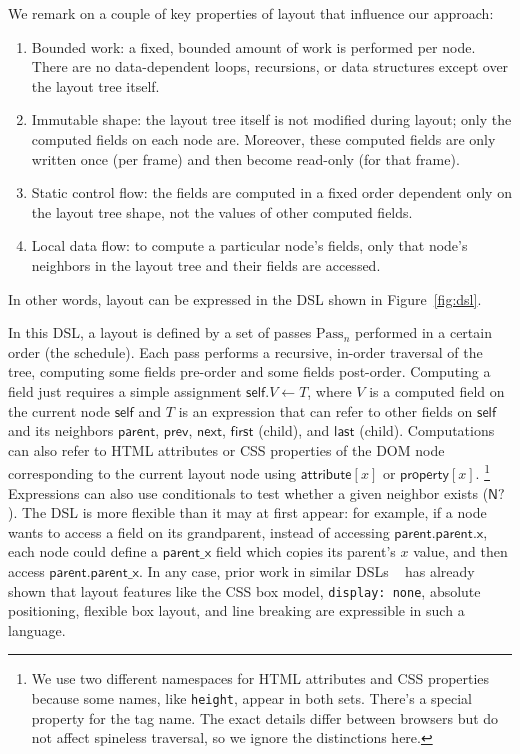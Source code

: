 We remark on a couple of key properties of layout
  that influence our approach:
\begin{enumerate}
    \item{Bounded work}: a fixed, bounded amount of work is performed per node. There are no data-dependent loops, recursions, or data structures except over the layout tree itself.
    \item{Immutable shape}: the layout tree itself is not modified during layout; only the computed fields on each node are. Moreover, these computed fields are only written once (per frame) and then become read-only (for that frame).
    \item{Static control flow}: the fields are computed in a fixed order dependent only on the layout tree shape, not the values of other computed fields.
    \item{Local data flow}: to compute a particular node's fields, only that node's neighbors in the layout tree and their fields are accessed.
\end{enumerate}
In other words, layout can be expressed in the DSL
  shown in Figure~\ref{fig:dsl}.

In this DSL, a layout is defined by a set of passes
  $\text{Pass}_n$ performed in a certain order (the schedule).
Each pass performs a recursive, in-order traversal of the tree,
  computing some fields pre-order and some fields post-order.
Computing a field just requires
  a simple assignment $\mathsf{self}.V \gets T$,
  where $V$ is a computed field on the current node $\mathsf{self}$
  and $T$ is an expression that can refer to
  other fields on $\mathsf{self}$ and its neighbors
  $\mathsf{parent}$, $\mathsf{prev}$, $\mathsf{next}$,
  $\mathsf{first}$ (child), and $\mathsf{last}$ (child).
Computations can also refer to HTML attributes or CSS properties
  of the DOM node corresponding to the current layout node
  using $\mathsf{attribute}[x]$ or $\mathsf{property}[x]$.%
\footnote{
    We use two different namespaces
    for HTML attributes and CSS properties
    because some names, like \texttt{height},
    appear in both sets.
    There's a special property for the tag name.
    The exact details differ between browsers
    but do not affect spineless traversal,
    so we ignore the distinctions here.
}
Expressions can also use conditionals
  to test whether a given neighbor exists ($\mathsf{N?}$).
The DSL is more flexible than it may at first appear:
  for example, if a node wants to access a field on its grandparent,
  instead of accessing $\mathsf{parent}.\mathsf{parent}.\mathsf{x}$,
  each node could define a $\mathsf{parent\_x}$ field which copies
  its parent's $x$ value,
  and then access $\mathsf{parent}.\mathsf{parent\_x}$.
In any case, prior work in similar DSLs%
  ~\cite{meyerovich-1, meyerovich-2, cassius-1,
  cassius-2, cassius-3, yufeng-1, yufeng-2}
  has already shown that layout features
  like the CSS box model, \texttt{display: none},
  absolute positioning, flexible box layout,
  and line breaking are expressible in such a language.

